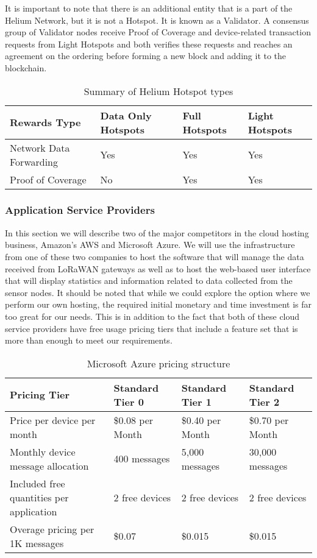 It is important to note that there is an additional entity that is a part of the Helium Network, but it is not a Hotspot. It is known as a Validator. A consensus group of Validator nodes receive Proof of Coverage and device-related transaction requests from Light Hotspots and both verifies these requests and reaches an agreement on the ordering before forming a new block and adding it to the blockchain.

\begin{table}
\centering
\caption{Summary of Helium Hotspot types}
\begin{tabular}{|l|l|l|l|}
\hline
Rewards Type & Data Only Hotspots & Full Hotspots & Light Hotspots \\
\hline
Network Data Forwarding & Yes & Yes & Yes \\\hline
Proof of Coverage & No & Yes & Yes \\\hline
\end{tabular}
\label{tab:helium-hotspot-classes}
\end{table}

\subsubsection{Application Service Providers}
In this section we will describe two of the major competitors in the cloud hosting business, Amazon's AWS and Microsoft Azure. We will use the infrastructure from one of these two companies to host the software that will manage the data received from LoRaWAN gateways as well as to host the web-based user interface that will display statistics and information related to data collected from the sensor nodes. It should be noted that while we could explore the option where we perform our own hosting, the required initial monetary and time investment is far too great for our needs. This is in addition to the fact that both of these cloud service providers have free usage pricing tiers that include a feature set that is more than enough to meet our requirements.

\begin{table}[t]
\centering\footnotesize
\caption{Microsoft Azure pricing structure}
\begin{tabular}{|l|l|l|l|}
\hline
Pricing Tier & Standard Tier 0 & Standard Tier 1 & Standard Tier 2 \\\hline
Price per device per month & \$0.08 per Month & \$0.40 per Month & \$0.70 per Month \\\hline
Monthly device message allocation & 400 messages & 5,000 messages & 30,000 messages \\\hline
Included free quantities per application & 2 free devices & 2 free devices  & 2 free devices  \\\hline
Overage pricing per 1K messages & \$0.07 & \$0.015 & \$0.015 \\\hline
\end{tabular}
\label{tab:azure-pricing}
\end{table}

